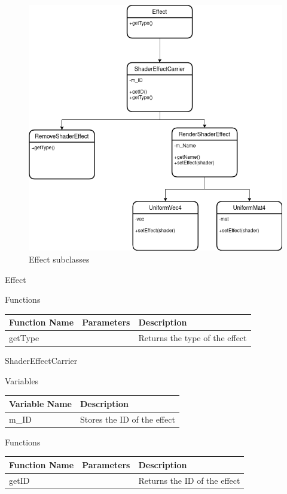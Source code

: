 \documentclass[../../Main.tex]{subfiles}
\begin{document}
    \begin{figure}[hbt!]
        \centerline{\includegraphics[scale=0.5]{img/Classes/Effects.png}}
        \caption{Effect subclasses}
        \label{fig}
    \end{figure}
    Effect
    \begin{center}
        Functions
        \begin{tabular}{ | m{} | m{}| m{} | }
            \hline
            \textbf{Function Name} & \textbf{Parameters} & \textbf{Description} \\
            \hline
            getType & & Returns the type of the effect \\
            \hline
        \end{tabular}
    \end{center}
    ShaderEffectCarrier
    \begin{center}
        Variables
        \begin{tabular}{ | m{} | m{} | }
            \hline
            \textbf{Variable Name} & \textbf{Description} \\
            \hline
            m\_ID & Stores the ID of the effect \\
            \hline
        \end{tabular}
        Functions
        \begin{tabular}{ | m{} | m{}| m{} | }
            \hline
            \textbf{Function Name} & \textbf{Parameters} & \textbf{Description} \\
            \hline
            getID & & Returns the ID of the effect \\
            \hline
        \end{tabular}
    \end{center}
\end{document}
